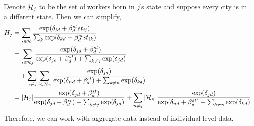 \documentclass{article}
\begin{document}
Denote $\mathcal{H}_j$ to be the set of workers born in $j$'s state and suppose every city is in a different state. Then we can simplify,
\begin{align*}
H_{j} &= \sum_{i\in\mathcal{H}} \frac{\exp(\delta_{jd} + \beta_d^{st}st_{ij})}{\sum_{k} \exp(\delta_{kd} + \beta_d^{st}st_{ik})} \\
&= \sum_{i\in\mathcal{H}_j} \frac{\exp(\delta_{jd} + \beta_d^{st})}{\exp(\delta_{jd} + \beta_d^{st}) + \sum_{k\neq j} \exp(\delta_{jd})} \\
&\quad+ \sum_{n\neq j}\sum_{i\in \mathcal{H}_n} \frac{\exp(\delta_{jd})}{\exp(\delta_{nd} + \beta_d^{st})+\sum_{k\neq n} \exp(\delta_{kd})} \\
&= |\mathcal{H}_j|\frac{\exp(\delta_{jd} + \beta_d^{st})}{\exp(\delta_{jd} + \beta_d^{st}) + \sum_{k\neq j} \exp(\delta_{jd})} + \sum_{n\neq j} |\mathcal{H}_n| \frac{\exp(\delta_{jd})}{\exp(\delta_{nd} + \beta_d^{st})+\sum_{k\neq n} \exp(\delta_{kd})} 
\end{align*}
Therefore, we can work with aggregate data instead of individual level data.









\end{document}
